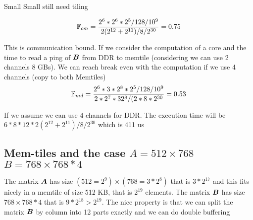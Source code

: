 \documentclass[conference]{IEEEtran}
\begin{document}
\begin{algorithm}
  \caption{Small Small still need tiling}
  \label{alg:one3}
  \begin{algorithmic}[1]
      \ENDFOR
    \ENDFOR
  \end{algorithmic}  
\end{algorithm}

\[
\mathbb{F}_{cm} = \frac{2^6 * 2^6 * 2^5/128/10^9 } {2(2^{12}+2^{11})/8/2^{30}}=  0.75  
\]

This is communication bound. If we consider the computation of a core
and the time to read a ping of ${\boldsymbol B}$ from DDR to memtile
(considering we can use 2 channels 8 GBs). We can reach break even
with the computation if we use 4 channels (copy to both
Memtiles)
\[
\mathbb{F}_{md} = \frac{2^6 * 3*2^8 * 2^5 /128/10^9  } {2*2^7*32^8/(2*8*2^{30}} = 0.53
\]

If we assume we can use 4 channels for DDR. The execution time will be
$6*8*12*{2(2^{12}+2^{11})/8/2^{30}}$ which is 411 us




\subsection{Mem-tiles and the case   $A=512\times 768$ $B=768\times 768*4$ }
The matrix ${\boldsymbol A}$ has size $(512=2^9) \times (768= 3*2^8)$ that is
$3*2^{17}$ and this fits nicely in a memtile of size 512 KB, that is
$2^{19}$ elements.  The matrix ${\boldsymbol B}$ has size $768 \times 768*4$
that is $9*2^{18}>2^{19}$. The nice property is that we can split the
matrix ${\boldsymbol B}$ by column into 12 parts exactly and we can do double
buffering 
\end{document}
